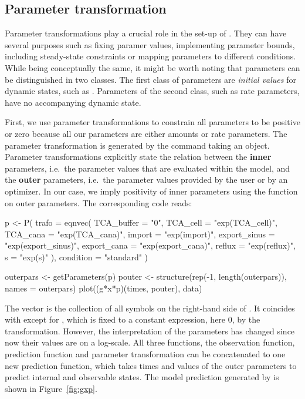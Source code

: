 \documentclass[article]{jss}
\begin{document}
\subsection{Parameter transformation}
Parameter transformations play a crucial role in the set-up of . They can have several purposes such as fixing paramer values, implementing parameter bounds, including steady-state constraints or mapping parameters to different conditions. While being conceptually the same, it might be worth noting that parameters can be distinguished in two classes. The first class of parameters are \textit{initial values} for dynamic states, such as . Parameters of the second class, such as rate parameters, have no accompanying dynamic state.

First, we use parameter transformations to constrain all parameters to be positive or zero because all our parameters are either amounts or rate parameters. The parameter transformation is generated by the  command taking an  object. Parameter transformations explicitly state the relation between the \textbf{inner} parameters, i.e.~the parameter values that are evaluated within the model, and the \textbf{outer} parameters, i.e.~the parameter values provided by the user or by an optimizer. In our case, we imply positivity of inner parameters using the  function on outer parameters.
The corresponding code reads:
\begin{CodeChunk}
\begin{CodeInput}
p <- P(
  trafo = eqnvec(
    TCA_buffer = "0",
    TCA_cell = "exp(TCA_cell)",
    TCA_cana = "exp(TCA_cana)",
    import = "exp(import)",
    export_sinus = "exp(export_sinus)",
    export_cana = "exp(export_cana)",
    reflux = "exp(reflux)",
    s = "exp(s)"
  ),
  condition = "standard"
)

outerpars <- getParameters(p)
pouter <- structure(rep(-1, length(outerpars)), names = outerpars)
plot((g*x*p)(times, pouter), data)
\end{CodeInput}
\end{CodeChunk}
The vector  is the collection of all symbols on the right-hand side of . It coincides with  except for , which is fixed to a constant expression, here 0, by the transformation. However, the interpretation of the parameters has changed since now their values are on a log-scale. All three functions, the observation function, prediction function and parameter transformation can be concatenated to one new prediction function,  which takes times and values of the outer parameters to predict internal and observable states. The model prediction generated by  is shown in Figure~\ref{fig:gxp}.
\end{document}
